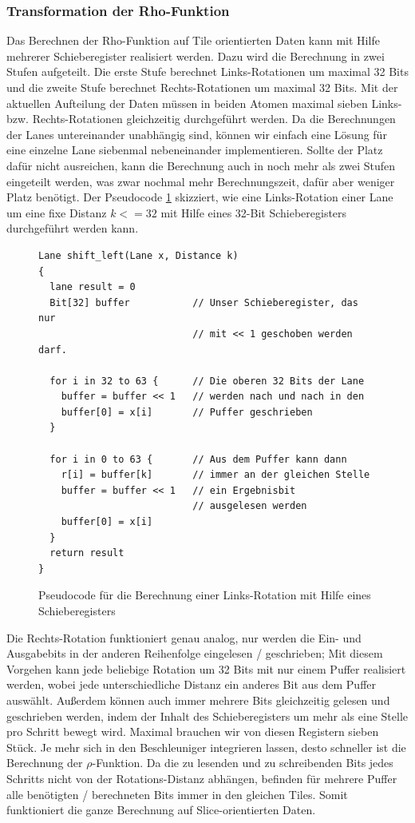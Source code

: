 \subsubsection{Transformation der Rho-Funktion}
\label{cha:iteration_2_rho_transformation}
Das Berechnen der Rho-Funktion auf Tile orientierten Daten kann mit Hilfe mehrerer Schieberegister realisiert werden.
Dazu wird die Berechnung in zwei Stufen aufgeteilt. Die erste Stufe berechnet Links-Rotationen um maximal 32 Bits
und die zweite Stufe berechnet Rechts-Rotationen um maximal 32 Bits. Mit der aktuellen Aufteilung der Daten müssen in beiden Atomen
maximal sieben Links- bzw. Rechts-Rotationen gleichzeitig durchgeführt werden. Da die Berechnungen der Lanes untereinander unabhängig sind,
können wir einfach eine Lösung für eine einzelne Lane siebenmal nebeneinander implementieren. Sollte der Platz dafür nicht ausreichen,
kann die Berechnung auch in noch mehr als zwei Stufen eingeteilt werden, was zwar nochmal mehr Berechnungszeit, dafür aber weniger Platz benötigt.
Der Pseudocode \ref{fig:iteration_2_leftshift} skizziert, wie eine Links-Rotation einer Lane um eine fixe Distanz $k <= 32$ mit Hilfe eines 32-Bit Schieberegisters
durchgeführt werden kann.
\begin{figure}
\lstset{xleftmargin=2em}
\lstset{language=C}
\begin{lstlisting}[label={lst:shift_left}]
Lane shift_left(Lane x, Distance k)
{
  lane result = 0
  Bit[32] buffer           // Unser Schieberegister, das nur
                           // mit << 1 geschoben werden darf.

  for i in 32 to 63 {      // Die oberen 32 Bits der Lane
    buffer = buffer << 1   // werden nach und nach in den
    buffer[0] = x[i]       // Puffer geschrieben
  }
  
  for i in 0 to 63 {       // Aus dem Puffer kann dann
    r[i] = buffer[k]       // immer an der gleichen Stelle
    buffer = buffer << 1   // ein Ergebnisbit
                           // ausgelesen werden
	buffer[0] = x[i]
  }
  return result
}
\end{lstlisting}
\caption{Pseudocode für die Berechnung einer Links-Rotation mit Hilfe eines Schieberegisters}
\label{fig:iteration_2_leftshift}
\end{figure}
Die Rechts-Rotation funktioniert genau analog, nur werden die Ein- und Ausgabebits in der anderen Reihenfolge eingelesen / geschrieben;
Mit diesem Vorgehen kann jede beliebige Rotation um 32 Bits mit nur einem Puffer realisiert werden, wobei jede unterschiedliche
Distanz ein anderes Bit aus dem Puffer auswählt. Außerdem können auch immer mehrere Bits gleichzeitig gelesen und geschrieben werden,
indem der Inhalt des Schieberegisters um mehr als eine Stelle pro Schritt bewegt wird.
Maximal brauchen wir von diesen Registern sieben Stück. Je mehr sich in den Beschleuniger integrieren lassen,
desto schneller ist die Berechnung der $\rho$-Funktion. Da die zu lesenden und zu schreibenden Bits jedes Schritts nicht von der Rotations-Distanz
abhängen, befinden für mehrere Puffer alle benötigten / berechneten Bits immer in den gleichen Tiles.
Somit funktioniert die ganze Berechnung auf Slice-orientierten Daten.

